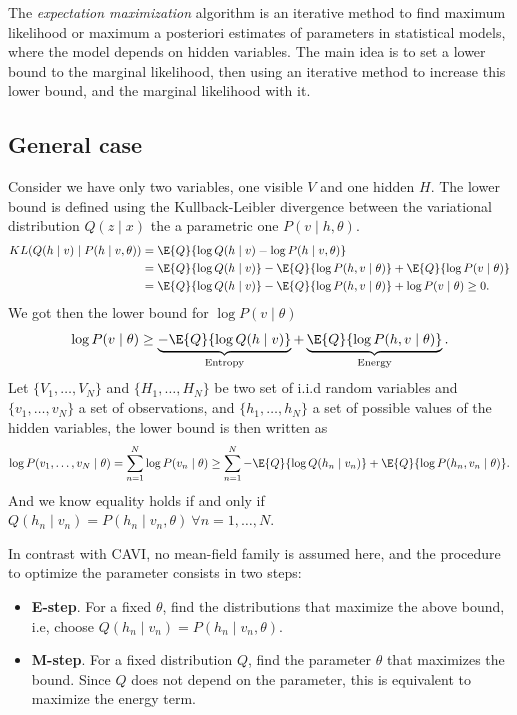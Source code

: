 

The \emph{expectation maximization} algorithm is an iterative method to find maximum likelihood or maximum a posteriori estimates of parameters in statistical models, where the model depends on hidden variables. The main idea is to set a lower bound to the marginal likelihood, then using an iterative method to increase this lower bound, and the marginal likelihood with it.

\subsection{General case}

Consider we have only two variables, one visible \(V\) and one hidden \(H\). The lower bound is defined using the Kullback-Leibler divergence between the variational distribution \(Q(z\mid x)\) the a parametric one \(P(v \mid h, \theta)\).
\[
  \begin{aligned}
    KL(Q(h\mid v) \mid P(h \mid v, \theta)) &= \E{Q}{\log{Q(h \mid v)} - \log{P(h \mid v, \theta)}} \\
    &= \E{Q}{\log{Q(h \mid v)}} - \E{Q}{\log{P(h,v \mid \theta)}} + \E{Q}{\log{P(v \mid \theta)}}\\
    &= \E{Q}{\log{Q(h \mid v)}} - \E{Q}{\log{P(h,v \mid \theta)}} + \log{P(v \mid \theta)} \geq 0.
  \end{aligned}
\]
We got then the lower bound for \(\log P(v \mid \theta)\)
\[
  \log{P(v \mid \theta)}\geq \underbrace{-\E{Q}{\log{Q(h \mid v)}}}_{\text{Entropy}} + \underbrace{\E{Q}{\log{P(h,v \mid \theta)}}}_{\text{Energy}}.
\]
Let \( \{V_1,\dots, V_N\} \) and \(\{H_1,\dots, H_N\} \) be two set of i.i.d random variables and \(\{v_{1}, \dots, v_{N}\}\) a set of observations, and \(\{h_1,\dots,h_N\} \) a set of possible values of the hidden variables,  the lower bound is then written as
\[
    \log{P(v_{1},\dots,v_{N} \mid \theta)} = \sum_{n=1}^{N}\log{P(v_{n} \mid \theta)} \geq \sum_{n = 1}^{N} -\E{Q}{\log{Q(h_{n} \mid v_{n})}} + \E{Q}{\log{P(h_{n},v_{n} \mid \theta)}}.
\]
And we know equality holds if and only if \(Q(h_{n} \mid v_{n}) = P(h_{n} \mid v_{n} , \theta) \ \forall n=1, \dots, N\).

In contrast with CAVI, no mean-field family is assumed here, and the procedure to optimize the parameter consists in two steps:
\begin{itemize}
  \item \textbf{E-step}. For a fixed \(\theta\), find the distributions that maximize the above bound, i.e, choose \(Q(h_{n} \mid v_{n}) = P(h_{n} \mid v_{n} , \theta)\).
  \item \textbf{M-step}. For a fixed distribution \(Q\), find the parameter \(\theta\) that maximizes the bound. Since \(Q\) does not depend on the parameter, this is equivalent to maximize the energy term.
\end{itemize}

